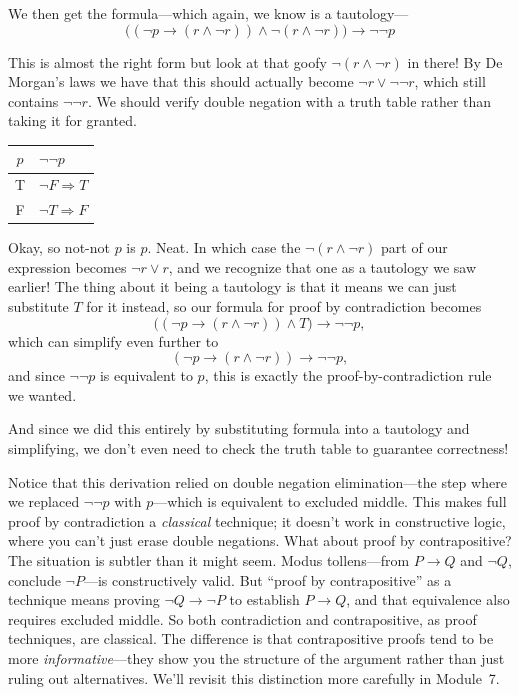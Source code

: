 \documentclass[11pt]{article}
\begin{document}
We then get the formula---which again, we know is a tautology---
\[
  \bigl((\lnot p \to (r \wedge \lnot r)) \wedge \lnot(r \wedge \lnot r)\bigr) \to \lnot\lnot p
\]

This is almost the right form but look at that goofy $\lnot(r \wedge \lnot r)$ in there! By De Morgan's laws we have that this should actually become $\lnot r \vee \lnot\lnot r$, which still contains $\lnot\lnot r$. We should verify double negation with a truth table rather than taking it for granted.

\begin{center}
\begin{tabular}{cl}
\toprule
$p$ & $\lnot\lnot p$ \\
\midrule
T & $\lnot F \Longrightarrow T$ \\
F & $\lnot T \Longrightarrow F$ \\
\bottomrule
\end{tabular}
\end{center}

Okay, so not-not $p$ is $p$. Neat. In which case the $\lnot(r \wedge \lnot r)$ part of our expression becomes $\lnot r \vee r$, and we recognize that one as a tautology we saw earlier! The thing about it being a tautology is that it means we can just substitute $T$ for it instead, so our formula for proof by contradiction becomes
\[
  \bigl((\lnot p \to (r \wedge \lnot r)) \wedge T\bigr) \to \lnot\lnot p,
\]
which can simplify even further to
\[
  (\lnot p \to (r \wedge \lnot r)) \to \lnot\lnot p,
\]
and since $\lnot\lnot p$ is equivalent to $p$, this is exactly the proof-by-contradiction rule we wanted.

And since we did this entirely by substituting formula into a tautology and simplifying, we don't even need to check the truth table to guarantee correctness!

Notice that this derivation relied on double negation elimination---the step where we replaced $\lnot\lnot p$ with $p$---which is equivalent to excluded middle. This makes full proof by contradiction a \emph{classical} technique; it doesn't work in constructive logic, where you can't just erase double negations. What about proof by contrapositive? The situation is subtler than it might seem. Modus tollens---from $P \to Q$ and $\lnot Q$, conclude $\lnot P$---is constructively valid. But ``proof by contrapositive'' as a technique means proving $\lnot Q \to \lnot P$ to establish $P \to Q$, and that equivalence also requires excluded middle. So both contradiction and contrapositive, as proof techniques, are classical. The difference is that contrapositive proofs tend to be more \emph{informative}---they show you the structure of the argument rather than just ruling out alternatives. We'll revisit this distinction more carefully in Module~7.
\end{document}
